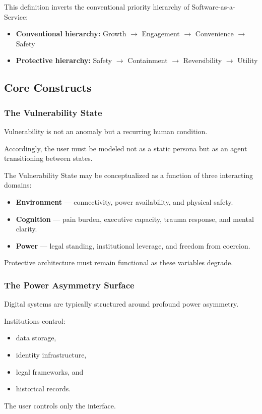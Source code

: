 \documentclass[12pt]{article}
\begin{document}
This definition inverts the conventional priority hierarchy of Software-as-a-Service:

\begin{itemize}
\item \textbf{Conventional hierarchy:} Growth $\rightarrow$ Engagement $\rightarrow$ Convenience $\rightarrow$ Safety
\item \textbf{Protective hierarchy:} Safety $\rightarrow$ Containment $\rightarrow$ Reversibility $\rightarrow$ Utility
\end{itemize}

\subsection{Core Constructs}

\subsubsection{The Vulnerability State}
Vulnerability is not an anomaly but a recurring human condition.

Accordingly, the user must be modeled not as a static persona but as an agent transitioning between states.

The Vulnerability State may be conceptualized as a function of three interacting domains:

\begin{itemize}
\item \textbf{Environment} --- connectivity, power availability, and physical safety.
\item \textbf{Cognition} --- pain burden, executive capacity, trauma response, and mental clarity.
\item \textbf{Power} --- legal standing, institutional leverage, and freedom from coercion.
\end{itemize}

Protective architecture must remain functional as these variables degrade.

\subsubsection{The Power Asymmetry Surface}
Digital systems are typically structured around profound power asymmetry.

Institutions control:
\begin{itemize}
\item data storage,
\item identity infrastructure,
\item legal frameworks, and
\item historical records.
\end{itemize}
The user controls only the interface.
\end{document}
